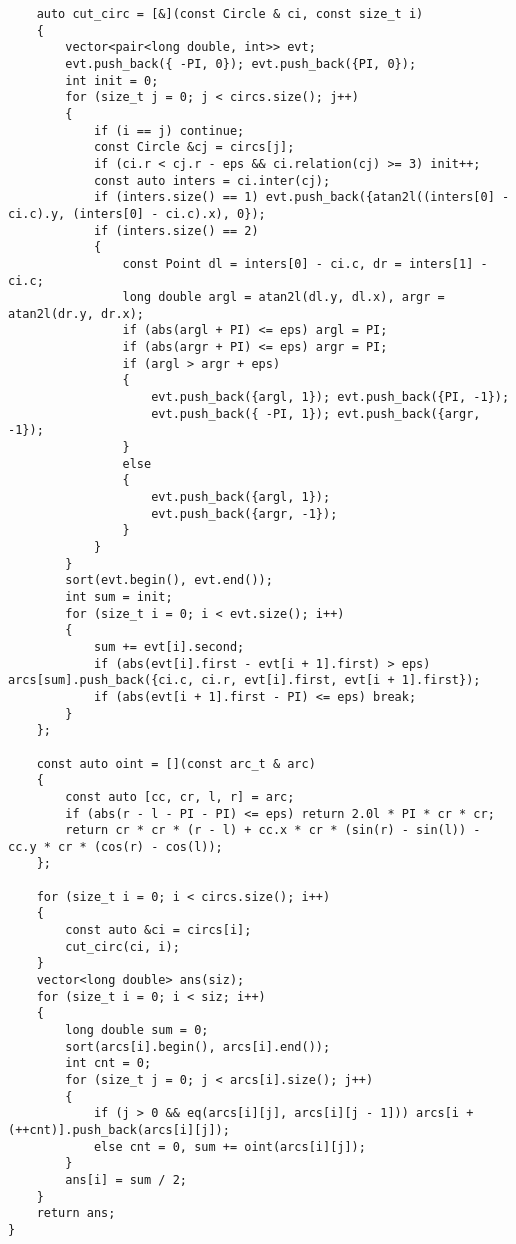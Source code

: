 \documentclass[a4paper,10pt]{article}
\begin{document}
\begin{lstlisting}
    auto cut_circ = [&](const Circle & ci, const size_t i)
    {
        vector<pair<long double, int>> evt;
        evt.push_back({ -PI, 0}); evt.push_back({PI, 0});
        int init = 0;
        for (size_t j = 0; j < circs.size(); j++)
        {
            if (i == j) continue;
            const Circle &cj = circs[j];
            if (ci.r < cj.r - eps && ci.relation(cj) >= 3) init++;
            const auto inters = ci.inter(cj);
            if (inters.size() == 1) evt.push_back({atan2l((inters[0] - ci.c).y, (inters[0] - ci.c).x), 0});
            if (inters.size() == 2)
            {
                const Point dl = inters[0] - ci.c, dr = inters[1] - ci.c;
                long double argl = atan2l(dl.y, dl.x), argr = atan2l(dr.y, dr.x);
                if (abs(argl + PI) <= eps) argl = PI;
                if (abs(argr + PI) <= eps) argr = PI;
                if (argl > argr + eps)
                {
                    evt.push_back({argl, 1}); evt.push_back({PI, -1});
                    evt.push_back({ -PI, 1}); evt.push_back({argr, -1});
                }
                else
                {
                    evt.push_back({argl, 1});
                    evt.push_back({argr, -1});
                }
            }
        }
        sort(evt.begin(), evt.end());
        int sum = init;
        for (size_t i = 0; i < evt.size(); i++)
        {
            sum += evt[i].second;
            if (abs(evt[i].first - evt[i + 1].first) > eps) arcs[sum].push_back({ci.c, ci.r, evt[i].first, evt[i + 1].first});
            if (abs(evt[i + 1].first - PI) <= eps) break;
        }
    };

    const auto oint = [](const arc_t & arc)
    {
        const auto [cc, cr, l, r] = arc;
        if (abs(r - l - PI - PI) <= eps) return 2.0l * PI * cr * cr;
        return cr * cr * (r - l) + cc.x * cr * (sin(r) - sin(l)) - cc.y * cr * (cos(r) - cos(l));
    };

    for (size_t i = 0; i < circs.size(); i++)
    {
        const auto &ci = circs[i];
        cut_circ(ci, i);
    }
    vector<long double> ans(siz);
    for (size_t i = 0; i < siz; i++)
    {
        long double sum = 0;
        sort(arcs[i].begin(), arcs[i].end());
        int cnt = 0;
        for (size_t j = 0; j < arcs[i].size(); j++)
        {
            if (j > 0 && eq(arcs[i][j], arcs[i][j - 1])) arcs[i + (++cnt)].push_back(arcs[i][j]);
            else cnt = 0, sum += oint(arcs[i][j]);
        }
        ans[i] = sum / 2;
    }
    return ans;
}\end{lstlisting}
\end{document}
